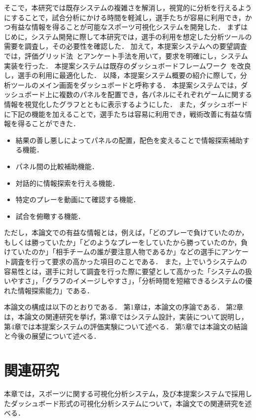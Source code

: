 \documentclass[sotsuron]{kuee}
\begin{document}
	そこで，本研究では既存システムの複雑さを解消し，視覚的に分析を行えるようにすることで，試合分析にかける時間を軽減し，選手たちが容易に利用でき，かつ有益な情報を得ることが可能なスポーツ可視化システムを開発した． 
	まずはじめに，システム開発に際して本研究では，選手の利用を想定した分析ツールの需要を調査し，その必要性を確認した． 
	加えて，本提案システムへの要望調査では，評価グリッド法~\cite{EGM}とアンケート手法を用いて，要求を明確にし，システム実装を行った． 
	本提案システムは既存のダッシュボードフレームワーク~\cite{dashboard}を改良し，選手の利用に最適化した． 
	以降，本提案システム概要の紹介に際して，分析ツールのメイン画面をダッシュボードと呼称する． 
	本提案システムでは，ダッシュボード上に複数のパネルを配置でき，各パネルにそれぞれゲームに関する情報を視覚化したグラフとともに表示するようにした． 
	また，ダッシュボードに下記の機能を加えることで，選手たちは容易に利用でき，戦術改善に有益な情報を得ることができた． 
		\begin{itemize}
			\item 結果の善し悪しによってパネルの配置，配色を変えることで情報探索補助する機能． 
			\item パネル間の比較補助機能． 
			\item 対話的に情報探索を行える機能． 
			\item 特定のプレーを動画にて確認する機能． 
			\item 試合を俯瞰する機能． 
		\end{itemize}
	ただし，本論文での有益な情報とは，例えば，「どのプレーで負けていたのか，もしくは勝っていたか」「どのようなプレーをしていたから勝っていたのか，負けていたのか」「相手チームの誰が要注意人物であるか」などの選手にアンケート調査を行って要求の高かった項目のことである． 
	また，上でいうシステムの容易性とは，選手に対して調査を行った際に要望として高かった「システムの扱いやすさ」，「グラフのイメージしやすさ」，「分析時間を短縮できるシステムの優れた情報探索能力」である． 
	
	本論文の構成は以下のとおりである． 
	第1章は，本論文の序論である． 第2章は，本論文の関連研究を挙げ，第3章ではシステム設計，実装について説明し，第4章では本提案システムの評価実験について述べる． 
	第5章では本論文の結論と今後の展望について述べる． 

\chapter{関連研究}
	本章では，スポーツに関する可視化分析システム，及び本提案システムで採用したダッシュボード形式の可視化分析システムについて，本論文での関連研究を述べる． 
	
\end{document}
